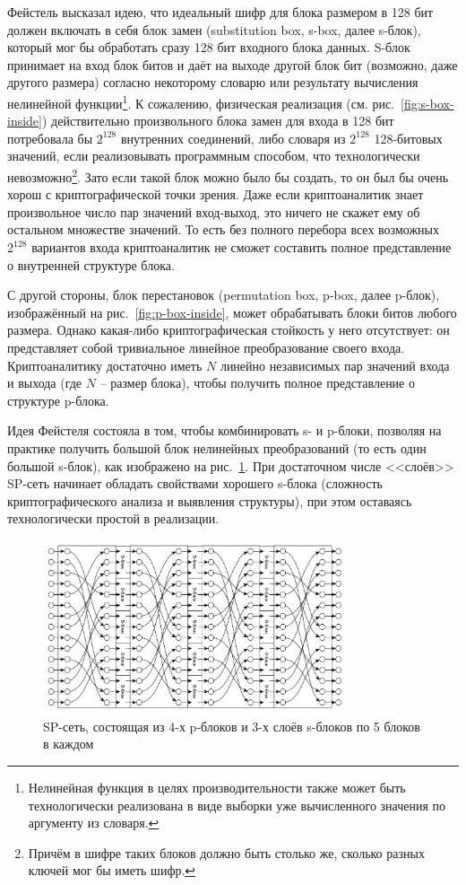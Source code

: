 Фейстель высказал идею, что идеальный шифр для блока размером в 128 бит должен включать в себя блок замен (substitution box, s-box, далее s-блок), который мог бы обработать сразу 128 бит входного блока данных. S-блок принимает на вход блок битов и даёт на выходе другой блок бит (возможно, даже другого размера) согласно некоторому словарю или результату вычисления нелинейной функции\footnote{Нелинейная функция в целях производительности также может быть технологически реализована в виде выборки уже вычисленного значения по аргументу из словаря.}. К сожалению, физическая реализация (см. рис.~\ref{fig:s-box-inside}) действительно произвольного блока замен для входа в 128 бит потребовала бы $2^{128}$ внутренних соединений, либо словаря из $2^{128}$ 128-битовых значений, если реализовывать программным способом, что технологически невозможно\footnote{Причём в шифре таких блоков должно быть столько же, сколько разных ключей мог бы иметь шифр.}. Зато если такой блок можно было бы создать, то он был бы очень хорош с криптографической точки зрения. Даже если криптоаналитик знает произвольное число пар значений вход-выход, это ничего не скажет ему об остальном множестве значений. То есть без полного перебора всех возможных $2^{128}$ вариантов входа криптоаналитик не сможет составить полное представление о внутренней структуре блока.

С другой стороны, блок перестановок (permutation box, p-box, далее p-блок), изображённый на рис.~\ref{fig:p-box-inside}, может обрабатывать блоки битов любого размера. Однако какая-либо криптографическая стойкость у него отсутствует: он представляет собой тривиальное линейное преобразование своего входа. Криптоаналитику достаточно иметь $N$ линейно независимых пар значений входа и выхода (где $N$ -- размер блока), чтобы получить полное представление о структуре p-блока.

Идея Фейстеля состояла в том, чтобы комбинировать s- и p-блоки, позволяя на практике получить большой блок нелинейных преобразований (то есть один большой s-блок), как изображено на рис.~\ref{fig:sp-network}. При достаточном числе <<слоёв>> SP-сеть начинает обладать свойствами хорошего s-блока (сложность криптографического анализа и выявления структуры), при этом оставаясь технологически простой в реализации.

\begin{figure}[htb]
	\centering
	\includegraphics[width=0.8\textwidth]{pic/sp-network}
  \caption{SP-сеть, состоящая из 4-х p-блоков и 3-х слоёв s-блоков по 5 блоков в каждом}
  \label{fig:sp-network}
\end{figure}

